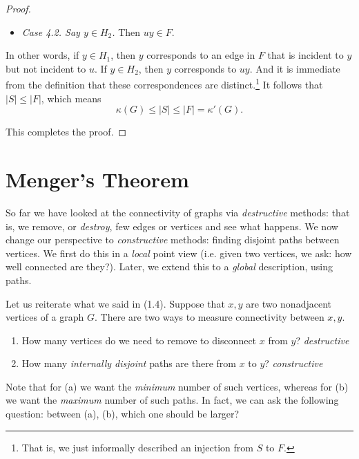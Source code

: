 \documentclass[co342]{subfiles}
\begin{document}
\begin{proof}
\begin{itemize}
\begin{itemize}
                    \item \textit{Case 4.2. Say $y\in H_2$.} Then $uy\in F$.
                \end{itemize} 
                In other words, if $y\in H_1$, then $y$ corresponds to an edge in $F$ that is incident to $y$ but not incident to $u$. If $y\in H_2$, then $y$ corresponds to $uy$. And it is immediate from the definition that these correspondences are distinct.\footnote{That is, we just informally described an injection from $S$ to $F$.} It follows that $\left| S \right| \leq \left| F \right|$, which means
                \begin{equation*}
                    \kappa\left( G \right) \leq \left| S \right| \leq \left| F \right| = \kappa'\left( G \right) .
                \end{equation*}
        \end{itemize} 
        This completes the proof.
    \end{proof}

    \section{Menger's Theorem}

    \np So far we have looked at the connectivity of graphs via \textit{destructive} methods: that is, we remove, or \textit{destroy}, few edges or vertices and see what happens. We now change our perspective to \textit{constructive} methods: finding disjoint paths between vertices. We first do this in a \textit{local} point view (i.e. given two vertices, we ask: how well connected are they?). Later, we extend this to a \textit{global} description, using paths.

    \np Let us reiterate what we said in (1.4). Suppose that $x,y$ are two nonadjacent vertices of a graph $G$. There are two ways to measure connectivity between $x,y$.
    \begin{enumerate}
        \item How many vertices do we need to remove to disconnect $x$ from $y$? \hfill\textit{destructive}
        \item How many \textit{internally disjoint} paths are there from $x$ to $y$? \hfill\textit{constructive}
    \end{enumerate}
    Note that for (a) we want the \textit{minimum} number of such vertices, whereas for (b) we want the \textit{maximum} number of such paths. In fact, we can ask the following question: between (a), (b), which one should be larger? 
\end{document}
